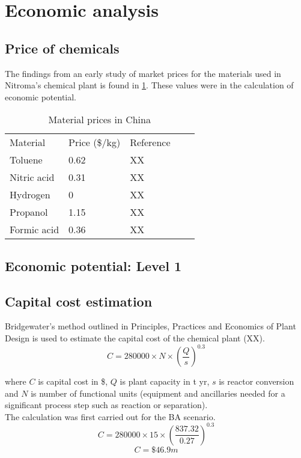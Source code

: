 
\section{Economic analysis}
\label{app:economics}
\subsection{Price of chemicals}

The findings from an early study of market prices for the materials used in Nitroma's chemical plant is found in \cref{tab:material-prices}. These values were in the calculation of economic potential.

\begin{table}[]
\begin{tabular}{lllll}
    \caption{Material prices in China}
    \label{tab:material-prices}
    \cline{1-3}
    Material    & Price (\$/kg) & Reference &  &  \\ \cline{1-3}
    Toluene     & 0.62          & XX        &  &  \\
    Nitric acid & 0.31          & XX        &  &  \\
    Hydrogen    & 0             & XX        &  &  \\
    Propanol    & 1.15          & XX        &  &  \\
    Formic acid & 0.36          & XX        &  &  \\ \cline{1-3}
\end{tabular}
\end{table}

\subsection{Economic potential: Level 1}

\subsection{Capital cost estimation}

Bridgewater's method outlined in Principles, Practices and Economics of Plant Design is used to estimate the capital cost of the chemical plant (XX).
\begin{equation}
    C=280000 \times N \times (\frac{Q}{s})^0.3
\end{equation}

where $C$ is capital cost in \$, $Q$ is  plant capacity in t yr, $s$ is reactor conversion and $N$ is number of functional units (equipment and ancillaries needed for a significant process step such as reaction or separation).\\
The calculation was first carried out for the BA scenario.
\begin{equation}
    C=280000 \times 15 \times (\frac{837.32}{0.27})^0.3
\end{equation}
\begin{equation}
    C=\$46.9m
\end{equation}
    
